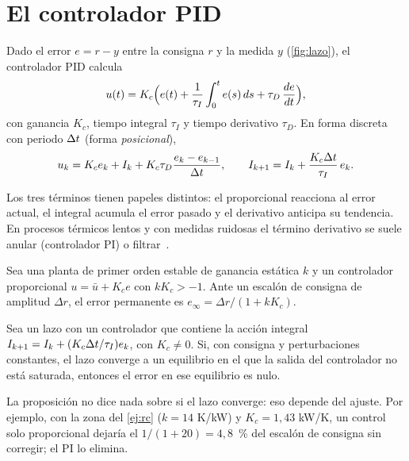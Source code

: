 \addtocounter{definicion}{1}%

\section{El controlador PID}

\addtocounter{figure}{1}%

\begin{definicion}\label{def:pid}
Dado el error $e=r-y$ entre la consigna $r$ y la medida $y$ (\cref{fig:lazo}), el controlador PID calcula
\[
u(t)=K_c\Bigl(e(t)+\frac{1}{\tau_I}\int_0^{t}e(s)\,ds+\tau_D\,\frac{de}{dt}\Bigr),
\]
con ganancia $K_c$, tiempo integral $\tau_I$ y tiempo derivativo $\tau_D$. En forma discreta con periodo $\Delta t$ (forma \emph{posicional}),
\[
u_k=K_ce_k+I_k+K_c\tau_D\frac{e_k-e_{k-1}}{\Delta t},\qquad I_{k+1}=I_k+\frac{K_c\Delta t}{\tau_I}\,e_k .
\]
\end{definicion}

Los tres términos tienen papeles distintos: el proporcional reacciona al error actual, el integral acumula el error pasado y el derivativo anticipa su tendencia. En procesos térmicos lentos y con medidas ruidosas el término derivativo se suele anular (controlador PI) o filtrar~\cite[cap.~11]{am}.

\begin{proposicion}\label{prop:offset}
Sea una planta de primer orden estable de ganancia estática $k$ y un controlador proporcional $u=\bar u+K_ce$ con $kK_c>-1$. Ante un escalón de consigna de amplitud $\Delta r$, el error permanente es $e_\infty=\Delta r/(1+kK_c)$.
\end{proposicion}

\begin{proposicion}\label{prop:integral}
Sea un lazo con un controlador que contiene la acción integral $I_{k+1}=I_k+(K_c\Delta t/\tau_I)e_k$, con $K_c\ne0$. Si, con consigna y perturbaciones constantes, el lazo converge a un equilibrio en el que la salida del controlador no está saturada, entonces el error en ese equilibrio es nulo.
\end{proposicion}

La proposición no dice nada sobre si el lazo converge: eso depende del ajuste. Por ejemplo, con la zona del \cref{ej:rc} ($k=14$ K/kW) y $K_c=1{,}43$ kW/K, un control solo proporcional dejaría el $1/(1+20)=4{,}8$~\% del escalón de consigna sin corregir; el PI lo elimina.

